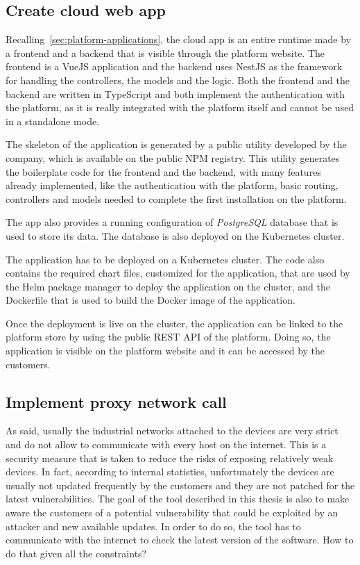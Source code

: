 \subsection{Create cloud web app}

Recalling~\cref{sec:platform-applications}, the cloud app is an entire runtime made by a frontend and a backend that is visible through the platform website. The frontend is a VueJS application and the backend uses NestJS as the framework for handling the controllers, the models and the logic. Both the frontend and the backend are written in TypeScript and both implement the authentication with the platform, as it is really integrated with the platform itself and cannot be used in a standalone mode.

The skeleton of the application is generated by a public utility developed by the company, which is available on the public NPM registry. This utility generates the boilerplate code for the frontend and the backend, with many features already implemented, like the authentication with the platform, basic routing, controllers and models needed to complete the first installation on the platform.

The app also provides a running configuration of \textit{PostgreSQL} database that is used to store its data. The database is also deployed on the Kubernetes cluster.

The application has to be deployed on a Kubernetes cluster. The code also contains the required chart files, customized for the application, that are used by the Helm package manager to deploy the application on the cluster, and the Dockerfile that is used to build the Docker image of the application.

Once the deployment is live on the cluster, the application can be linked to the platform store by using the public REST API of the platform. Doing so, the application is visible on the platform website and it can be accessed by the customers.

\subsection{Implement proxy network call}

As said, usually the industrial networks attached to the devices are very strict and do not allow to communicate with every host on the internet. This is a security measure that is taken to reduce the risks of exposing relatively weak devices. In fact, according to internal statistics, unfortunately the devices are usually not updated frequently by the customers and they are not patched for the latest vulnerabilities. The goal of the tool described in this thesis is also to make aware the customers of a potential vulnerability that could be exploited by an attacker and new available updates. In order to do so, the tool has to communicate with the internet to check the latest version of the software. How to do that given all the constraints?

